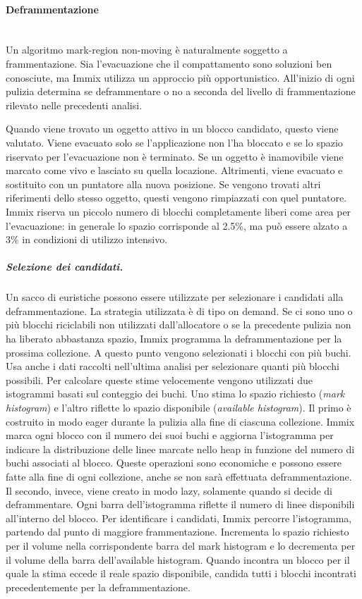 \paragraph{Deframmentazione} \mbox{} \\
Un algoritmo mark-region non-moving è naturalmente soggetto a frammentazione. Sia l'evacuazione che il compattamento sono soluzioni ben conosciute, ma Immix utilizza un approccio più opportunistico. All'inizio di ogni pulizia determina se deframmentare o no a seconda del livello di frammentazione rilevato nelle precedenti analisi. 

Quando viene trovato un oggetto attivo in un blocco candidato, questo viene valutato. Viene evacuato solo se l'applicazione non l'ha bloccato e se lo spazio riservato per l'evacuazione non è terminato. Se un oggetto è inamovibile viene marcato come vivo e lasciato su quella locazione. Altrimenti, viene evacuato e sostituito con un puntatore alla nuova posizione. Se vengono trovati altri riferimenti dello stesso oggetto, questi vengono rimpiazzati con quel puntatore. Immix riserva un piccolo numero di blocchi completamente liberi come area per l'evacuazione: in generale lo spazio corrisponde al 2.5\%, ma può essere alzato a 3\% in condizioni di utilizzo intensivo.

\subparagraph{Selezione dei candidati.} Un sacco di euristiche possono essere utilizzate per selezionare i candidati alla deframmentazione. La strategia utilizzata è di tipo on demand. Se ci sono uno o più blocchi riciclabili non utilizzati dall'allocatore o se la precedente pulizia non ha liberato abbastanza spazio, Immix programma la deframmentazione per la prossima collezione. A questo punto vengono selezionati i blocchi con più buchi. Usa anche i dati raccolti nell'ultima analisi per selezionare quanti più blocchi possibili. Per calcolare queste stime velocemente vengono utilizzati due istogrammi basati sul conteggio dei buchi. Uno stima lo spazio richiesto (\textit{mark histogram}) e l'altro riflette lo spazio disponibile (\textit{available histogram}). Il primo è costruito in modo eager durante la pulizia alla fine di ciascuna collezione. Immix marca ogni blocco con il numero dei suoi buchi e aggiorna l'istogramma per indicare la distribuzione delle linee marcate nello heap in funzione del numero di buchi associati al blocco. Queste operazioni sono economiche e possono essere fatte alla fine di ogni collezione, anche se non sarà effettuata deframmentazione. Il secondo, invece, viene creato in modo lazy, solamente quando si decide di deframmentare. Ogni barra dell'istogramma riflette il numero di linee disponibili all'interno del blocco. Per identificare i candidati, Immix percorre l'istogramma, partendo dal punto di maggiore frammentazione. Incrementa lo spazio richiesto per il volume nella corrispondente barra del mark histogram e lo decrementa per il volume della barra dell'available histogram. Quando incontra un blocco per il quale la stima eccede il reale spazio disponibile, candida tutti i blocchi incontrati precedentemente per la deframmentazione. 

